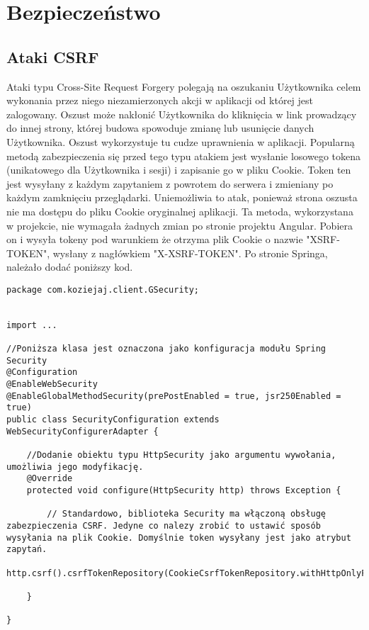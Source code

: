 \documentclass[a4paper,12pt,twoside,openany]{report}
\begin{document}
\chapter{Bezpieczeństwo}
\label{Safety}
\section{Ataki CSRF}
Ataki typu Cross-Site Request Forgery polegają na oszukaniu Użytkownika celem wykonania przez niego niezamierzonych akcji w aplikacji od której jest zalogowany. Oszust może nakłonić Użytkownika do kliknięcia w link prowadzący do innej strony, której budowa spowoduje zmianę lub usunięcie  danych Użytkownika. Oszust wykorzystuje tu cudze uprawnienia w aplikacji. Popularną metodą zabezpieczenia się przed tego typu atakiem jest wysłanie losowego tokena (unikatowego dla Użytkownika i sesji) i zapisanie go w pliku Cookie. Token ten jest wysyłany z każdym zapytaniem z powrotem do serwera i zmieniany po każdym zamknięciu przeglądarki. Uniemożliwia to atak, ponieważ strona oszusta nie ma dostępu do pliku Cookie oryginalnej aplikacji. Ta metoda, wykorzystana w projekcie, nie wymagała żadnych zmian po stronie projektu Angular. Pobiera on i wysyła tokeny pod warunkiem że otrzyma plik Cookie o nazwie "XSRF-TOKEN", wysłany z nagłówkiem "X-XSRF-TOKEN". Po stronie Springa, należało dodać poniższy kod.
\begin{lstlisting}
package com.koziejaj.client.GSecurity;


import ...

//Poniższa klasa jest oznaczona jako konfiguracja modułu Spring Security
@Configuration
@EnableWebSecurity
@EnableGlobalMethodSecurity(prePostEnabled = true, jsr250Enabled = true)
public class SecurityConfiguration extends WebSecurityConfigurerAdapter {

	//Dodanie obiektu typu HttpSecurity jako argumentu wywołania, umożliwia jego modyfikację.
    @Override
    protected void configure(HttpSecurity http) throws Exception {
    
		// Standardowo, biblioteka Security ma włączoną obsługę zabezpieczenia CSRF. Jedyne co nalezy zrobić to ustawić sposób wysyłania na plik Cookie. Domyślnie token wysyłany jest jako atrybut zapytań.
        http.csrf().csrfTokenRepository(CookieCsrfTokenRepository.withHttpOnlyFalse());

    }

}
\end{lstlisting}
\end{document}
